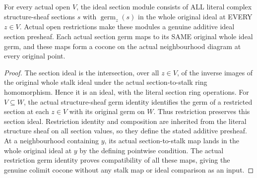\begin{definition}
\label{hir:real-domain-actual-ideal-section-presheaf}
\leanok
For every actual open $V$, the ideal section module consists of ALL
literal complex structure-sheaf sections $s$ with $\operatorname{germ}_z(s)$
in the whole original ideal at EVERY $z\in V$. Actual open restrictions
make these modules a genuine additive ideal section presheaf. Each actual
section germ maps to its SAME original whole ideal germ, and these maps
form a cocone on the actual neighbourhood diagram at every original point.
\end{definition}
\begin{proof}
The section ideal is the intersection, over all $z\in V$, of the inverse
images of the original whole stalk ideal under the actual section-to-stalk
ring homomorphism. Hence it is an ideal, with the literal section ring
operations. For $V\subseteq W$, the actual structure-sheaf germ identity
identifies the germ of a restricted section at each $z\in V$ with its
original germ on $W$. Thus restriction preserves this section ideal.
Restriction identity and composition are inherited from the literal
structure sheaf on all section values, so they define the stated additive
presheaf. At a neighbourhood containing $y$, its actual section-to-stalk
map lands in the whole original ideal at $y$ by the defining pointwise
condition. The actual restriction germ identity proves compatibility of
all these maps, giving the genuine colimit cocone without any stalk map
or ideal comparison as an input.
\end{proof}

